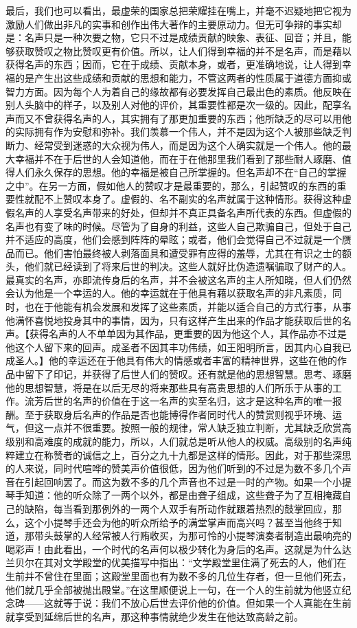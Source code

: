 \documentclass[12pt,oneside]{book}
\begin{document}
最后，我们也可以看出，最虚荣的国家总把荣耀挂在嘴上，并毫不迟疑地把它视为激励人们做出非凡的实事和创作出伟大著作的主要原动力。但无可争辩的事实却是：名声只是一种次要之物，它只不过是成绩贡献的映象、表征、回音；并且，能够获取赞叹之物比赞叹更有价值。所以，让人们得到幸福的并不是名声，而是藉以获得名声的东西；因而，它在于成绩、贡献本身，或者，更准确地说，让人得到幸福的是产生出这些成绩和贡献的思想和能力，不管这两者的性质属于道德方面抑或智力方面。因为每个人为着自己的缘故都有必要发挥自己最出色的素质。他反映在别人头脑中的样子，以及别人对他的评价，其重要性都是次一级的。因此，配享名声而又不曾获得名声的人，其实拥有了那更加重要的东西；他所缺乏的尽可以用他的实际拥有作为安慰和弥补。我们羡慕一个伟人，并不是因为这个人被那些缺乏判断力、经常受到迷惑的大众视为伟人，而是因为这个人确实就是一个伟人。他的最大幸福并不在于后世的人会知道他，而在于在他那里我们看到了那些耐人琢磨、值得人们永久保存的思想。他的幸福是被自己所掌握的。但名声却不在“自己的掌握之中”。在另一方面，假如他人的赞叹才是最重要的，那么，引起赞叹的东西的重要性就配不上赞叹本身了。虚假的、名不副实的名声就属于这种情形。获得这种虚假名声的人享受名声带来的好处，但却并不真正具备名声所代表的东西。但虚假的名声也有变了味的时候。尽管为了自身的利益，这些人自己欺骗自己，但处于自己并不适应的高度，他们会感到阵阵的晕眩；或者，他们会觉得自己不过就是一个赝品而已。他们害怕最终被人剥落面具和遭受罪有应得的羞辱，尤其在有识之士的额头，他们就已经读到了将来后世的判决。这些人就好比伪造遗嘱骗取了财产的人。最真实的名声，亦即流传身后的名声，并不会被这名声的主人所知晓，但人们仍然会认为他是一个幸运的人。他的幸运就在于他具有藉以获取名声的非凡素质，同时，也在于他能有机会发展和发挥了这些素质，并能以适合自己的方式行事，从事他满怀喜悦地投身其中的事情，因为，只有这样产生出来的作品才能获取后世的名声。【获得名声的人不单单因为其作品，更重要的因为他这个人，其作品亦不过是他这个人留下来的回声。成圣者不因其丰功伟绩，如王阳明所言，因其内心自我已成圣人。】他的幸运还在于他具有伟大的情感或者丰富的精神世界，这些在他的作品中留下了印记，并获得了后世人们的赞叹。还有就是他的思想智慧。思考、琢磨他的思想智慧，将是在以后无尽的将来那些具有高贵思想的人们所乐于从事的工作。流芳后世的名声的价值在于这一名声的实至名归，这才是这种名声的唯一报酬。至于获取身后名声的作品是否也能博得作者同时代人的赞赏则视乎环境、运气，但这一点并不很重要。按照一般的规律，常人缺乏独立判断，尤其缺乏欣赏高级别和高难度的成就的能力，所以，人们就总是听从他人的权威。高级别的名声纯粹建立在称赞者的诚信之上，百分之九十九都是这样的情形。因此，对于那些深思的人来说，同时代喧哗的赞美声价值很低，因为他们听到的不过是为数不多几个声音在引起回响罢了。而这为数不多的几个声音也不过是一时的产物。如果一个小提琴手知道：他的听众除了一两个以外，都是由聋子组成，这些聋子为了互相掩藏自己的缺陷，每当看到那例外的一两个人双手有所动作就跟着热烈的鼓掌回应，那么，这个小提琴手还会为他的听众所给予的满堂掌声而高兴吗？甚至当他终于知道，那带头鼓掌的人经常被人行贿收买，为那可怜的小提琴演奏者制造出最响亮的喝彩声！由此看出，一个时代的名声何以极少转化为身后的名声。这就是为什么达兰贝尔在其对文学殿堂的优美描写中指出：“文学殿堂里住满了死去的人，他们在生前并不曾住在里面；这殿堂里面也有为数不多的几位生存者，但一旦他们死去，他们就几乎全部被抛出殿堂。”在这里顺便说上一句，在一个人的生前就为他竖立纪念碑——这就等于说：我们不放心后世去评价他的价值。但如果一个人真能在生前就享受到延绵后世的名声，那这种事情就绝少发生在他达致高龄之前。
\end{document}
